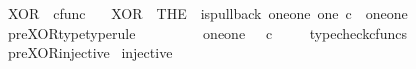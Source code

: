 \begin{isabellebody}
\endisatagproof
{\isafoldproof}%
%
\isadelimproof
%
\endisadelimproof
%
\isadelimdocument
%
\endisadelimdocument
%
\isatagdocument
%
\isamarkuptrue%
%
\endisatagdocument
{\isafolddocument}%
%
\isadelimdocument
%
\endisadelimdocument
{}\isamarkupfalse%
\ XOR\ {\isacharcolon}{\kern0pt}{\isacharcolon}{\kern0pt}\ {\isachardoublequoteopen}cfunc{\isachardoublequoteclose}\ \isanewline
\ \ {\isachardoublequoteopen}XOR\ {\isacharequal}{\kern0pt}\ {\isacharparenleft}{\kern0pt}THE\ {\isasymchi}{\isachardot}{\kern0pt}\ is{\isacharunderscore}{\kern0pt}pullback\ {\isacharparenleft}{\kern0pt}one{\isasymCoprod}one{\isacharparenright}{\kern0pt}\ one\ {\isacharparenleft}{\kern0pt}{\isasymOmega}{\isasymtimes}\isactrlsub c{\isasymOmega}{\isacharparenright}{\kern0pt}\ {\isasymOmega}\ {\isacharparenleft}{\kern0pt}{\isasymbeta}\isactrlbsub {\isacharparenleft}{\kern0pt}one{\isasymCoprod}one{\isacharparenright}{\kern0pt}\isactrlesub {\isacharparenright}{\kern0pt}\ {\isasymt}\ {\isacharparenleft}{\kern0pt}{\isasymlangle}{\isasymt}{\isacharcomma}{\kern0pt}\ {\isasymf}{\isasymrangle}\ {\isasymamalg}{\isasymlangle}{\isasymf}{\isacharcomma}{\kern0pt}\ {\isasymt}{\isasymrangle}{\isacharparenright}{\kern0pt}\ {\isasymchi}{\isacharparenright}{\kern0pt}{\isachardoublequoteclose}\isanewline
\isanewline
{}\isamarkupfalse%
\ pre{\isacharunderscore}{\kern0pt}XOR{\isacharunderscore}{\kern0pt}type{\isacharbrackleft}{\kern0pt}type{\isacharunderscore}{\kern0pt}rule{\isacharbrackright}{\kern0pt}{\isacharcolon}{\kern0pt}\ \isanewline
\ \ {\isachardoublequoteopen}{\isasymlangle}{\isasymt}{\isacharcomma}{\kern0pt}\ {\isasymf}{\isasymrangle}\ {\isasymamalg}\ {\isasymlangle}{\isasymf}{\isacharcomma}{\kern0pt}\ {\isasymt}{\isasymrangle}\ {\isacharcolon}{\kern0pt}\ one{\isasymCoprod}one\ {\isasymrightarrow}\ {\isasymOmega}\ {\isasymtimes}\isactrlsub c\ {\isasymOmega}{\isachardoublequoteclose}\isanewline
%
\isadelimproof
\ \ %
\endisadelimproof
%
\isatagproof
{}\isamarkupfalse%
\ typecheck{\isacharunderscore}{\kern0pt}cfuncs%
\endisatagproof
{\isafoldproof}%
%
\isadelimproof
\isanewline
%
\endisadelimproof
\isanewline
{}\isamarkupfalse%
\ pre{\isacharunderscore}{\kern0pt}XOR{\isacharunderscore}{\kern0pt}injective{\isacharcolon}{\kern0pt}\isanewline
\ {\isachardoublequoteopen}injective{\isacharparenleft}{\kern0pt}{\isasymlangle}{\isasymt}{\isacharcomma}{\kern0pt}\ {\isasymf}{\isasymrangle}\ {\isasymamalg}{\isasymlangle}{\isasymf}{\isacharcomma}{\kern0pt}\ {\isasymt}{\isasymrangle}{\isacharparenright}{\kern0pt}{\isachardoublequoteclose}\isanewline

\end{isabellebody}
